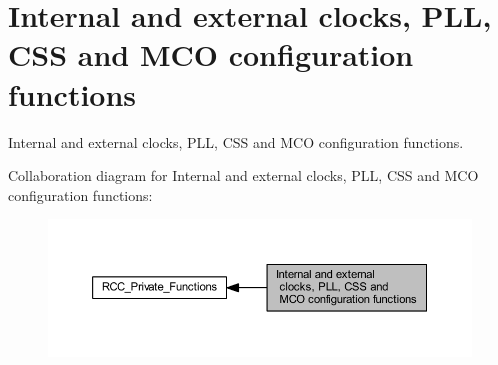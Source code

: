 \hypertarget{group___r_c_c___group1}{}\section{Internal and external clocks, P\+LL, C\+SS and M\+CO configuration functions}
\label{group___r_c_c___group1}


Internal and external clocks, P\+LL, C\+SS and M\+CO configuration functions.  


Collaboration diagram for Internal and external clocks, P\+LL, C\+SS and M\+CO configuration functions\+:
\nopagebreak
\begin{figure}[H]
\begin{center}
\leavevmode
\includegraphics[width=350pt]{group___r_c_c___group1}
\end{center}
\end{figure}
